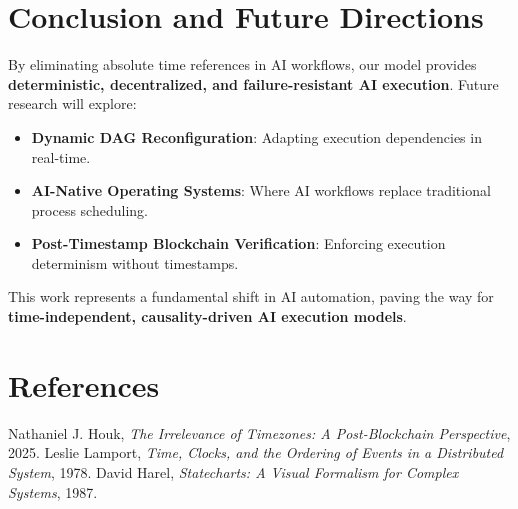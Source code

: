 \documentclass{article}
\begin{document}
\section{Conclusion and Future Directions}
By eliminating absolute time references in AI workflows, our model provides \textbf{deterministic, decentralized, and failure-resistant AI execution}. Future research will explore:
\begin{itemize}
    \item \textbf{Dynamic DAG Reconfiguration}: Adapting execution dependencies in real-time.
    \item \textbf{AI-Native Operating Systems}: Where AI workflows replace traditional process scheduling.
    \item \textbf{Post-Timestamp Blockchain Verification}: Enforcing execution determinism without timestamps.
\end{itemize}

This work represents a fundamental shift in AI automation, paving the way for \textbf{time-independent, causality-driven AI execution models}.

\section*{References}
\begin{thebibliography}{9}
 Nathaniel J. Houk, \textit{The Irrelevance of Timezones: A Post-Blockchain Perspective}, 2025.
 Leslie Lamport, \textit{Time, Clocks, and the Ordering of Events in a Distributed System}, 1978.
 David Harel, \textit{Statecharts: A Visual Formalism for Complex Systems}, 1987. 
\end{thebibliography}
\end{document}
